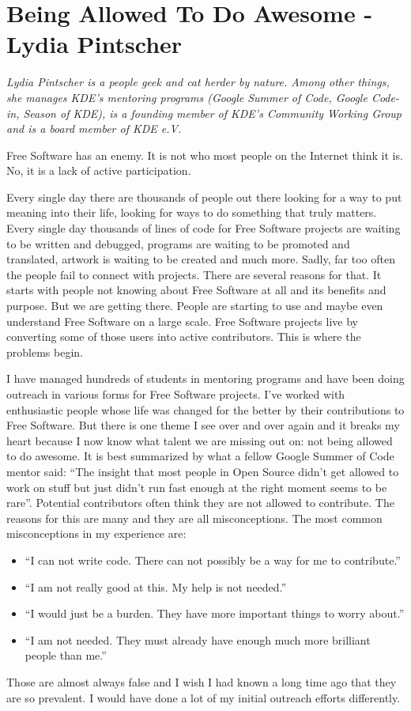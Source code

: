 \chapter{Being Allowed To Do Awesome - Lydia Pintscher}

\textit{Lydia Pintscher is a people geek and cat herder by nature. Among other
things, she manages KDE's mentoring programs (Google Summer of Code, Google
Code-in, Season of KDE), is a founding member of KDE's Community Working
Group and is a board member of KDE e.V.}

Free Software has an enemy. It is not who most people on the Internet think it
is. No, it is a lack of active participation.

Every single day there are thousands of people out there looking for a way to
put meaning into their life, looking for ways to do something that truly
matters. Every single day thousands of lines of code for Free Software projects
are waiting to be written and debugged, programs are waiting to be promoted and
translated, artwork is waiting to be created and much more. Sadly, far too often
the people fail to connect with projects. There are several reasons for
that. It starts with people not knowing about Free Software at all and its
benefits and purpose. But we are getting there. People are starting to use and
maybe even understand Free Software on a large scale. Free Software projects
live by converting some of those users into active contributors. This is where
the problems begin.

I have managed hundreds of students in mentoring programs and have been doing
outreach in various forms for Free Software projects. I've worked with
enthusiastic people whose life was changed for the better by their contributions
to Free Software. But there is one theme I see over and over again and it breaks
my heart because I now know what talent we are missing out on: not being allowed
to do awesome. It is best summarized by what a fellow Google Summer of Code
mentor said: ``The insight that most people in Open Source didn’t get allowed to
work on stuff but just didn’t run fast enough at the right moment seems to be
rare''. Potential contributors often think they are not allowed to contribute.
The reasons for this are many and they are all misconceptions. The most common
misconceptions in my experience are:
\begin{itemize}
 \item ``I can not write code. There can not possibly be a way for me to
contribute.''
 \item ``I am not really good at this. My help is not needed.''
 \item ``I would just be a burden. They have more important things to worry
about.''
 \item ``I am not needed. They must already have enough much more brilliant
people than me.''
\end{itemize}
Those are almost always false and I wish I had known a long time ago that they
are so prevalent. I would have done a lot of my initial outreach efforts
differently.

